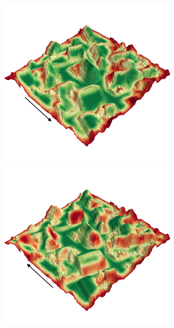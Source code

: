 \documentclass[../document.tex]{subfiles}
\begin{document}
\begin{figure} [htbp]
\begin{subfigure}[b]{0.45\textwidth}
  \end{subfigure}
  \begin{subfigure}[b]{0.45\textwidth}
    \includegraphics[width=\linewidth]{../img/4/traversability/sullens/-0.png}
  \end{subfigure}
  \begin{subfigure}[b]{0.45\textwidth}
      \includegraphics[width=\linewidth]{../img/4/traversability/sullens/-180.png}  

\end{subfigure}
\end{figure}
\end{document}
